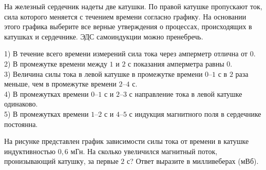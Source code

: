 \begin{taskbasic}[code={\label{task:elem_ind_v2_n14}}]
На железный сердечник надеты две катушки. По правой катушке пропускают ток, сила которого меняется с течением времени согласно графику. На основании этого графика выберите все верные утверждения о процессах, происходящих в катушках и сердечнике. ЭДС самоиндукции можно пренебречь.

1) В течение всего времени измерений сила тока через амперметр отлична от 0.\\
2) В промежутке времени между $1$ и $2\text{ с}$ показания амперметра равны 0.\\
3) Величина силы тока в левой катушке в промежутке времени $0\text{--}1\text{ с}$ в $2$ раза меньше, чем в промежутке времени $2\text{--}4\text{ с}$.\\
4) В промежутках времени $0\text{--}1\text{ с}$ и $2\text{--}3\text{ с}$ направление тока в левой катушке одинаково.\\
5) В промежутках времени $1\text{--}2\text{ с}$ и $4\text{--}5\text{ с}$ индукция магнитного поля в сердечнике постоянна.

\end{taskbasic}

\begin{taskbasic}[code={\label{task:elem_ind_v3_n12}}]
На рисунке представлен график зависимости силы тока от времени в катушке индуктивностью $0{,}6\text{ мГн}$. На сколько увеличился магнитный поток, пронизывающий катушку, за первые $2\text{ с}$? Ответ выразите в милливеберах (мВб).

\nopagebreak\smallskip
\begin{center}
\end{center}

\end{taskbasic}

